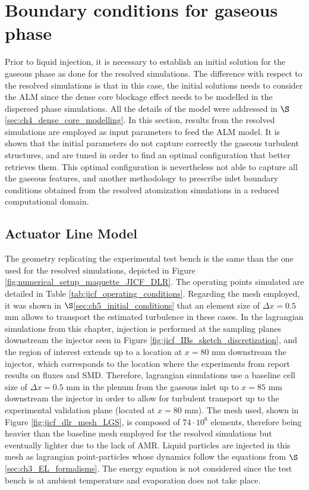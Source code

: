 \section{Boundary conditions for gaseous phase}
\label{sec:ch6_BC_gaseous_phase}



Prior to liquid injection, it is necessary to establish an initial solution for the gaseous phase as done for the resolved simulations. The difference with respect to the resolved simulations is that in this case, the initial solutions needs to consider the ALM since the dense core blockage effect needs to be modelled in the dispersed phase simulations. All the details of the model were addressed in $\S$\ref{sec:ch4_dense_core_modelling}. In this section, results from the resolved simulations are employed as input parameters to feed the ALM model. It is shown that the initial parameters do not capture correctly the gaseous turbulent structures, and are tuned in order to find an optimal configuration that better retrieves them. This optimal configuration is nevertheless not able to capture all the gaseous features, and another methodology to prescribe inlet boundary conditions obtained from the resolved atomization simulations in a reduced computational domain.


\subsection{Actuator Line Model}


The geometry replicating the experimental test bench is the same than the one used for the resolved simulations, depicted in Figure \ref{fig:numerical_setup_maquette_JICF_DLR}. The operating points simulated are detailed in Table \ref{tab:jicf_operating_conditions}. Regarding the mesh employed, it was shown in $\S$\ref{sec:ch5_initial_conditions} that an element size of $\Delta x = 0.5$ mm allows to transport the estimated turbulence in these cases. In the lagrangian simulations from this chapter, injection is performed at the sampling planes downstream the injector seen in Figure \ref{fig:jicf_IBs_sketch_discretization}, and the region of interest extends up to a location at $x = 80$ mm downstream the injector, which corresponds to the location where the experiments from  report results on fluxes and SMD. Therefore, lagrangian simulations use a baseline cell size of $\Delta x = 0.5$ mm in the plenum from the gaseous inlet up to $x = 85$ mm downstream the injector in order to allow for turbulent transport up to the experimental validation plane (located at $x = 80$ mm). The mesh used, shown in Figure \ref{fig:jicf_dlr_mesh_LGS}, is composed of $74 \cdot 10^6$ elements, therefore being heavier than the baseline mesh employed for the resolved simulations but eventually lighter due to the lack of AMR. Liquid particles are injected in this mesh as lagrangian point-particles whose dynamics follow the equations from  $\S$\ref{sec:ch3_EL_formalisms}. The energy equation is not considered since the test bench is at ambient temperature and evaporation does not take place.


